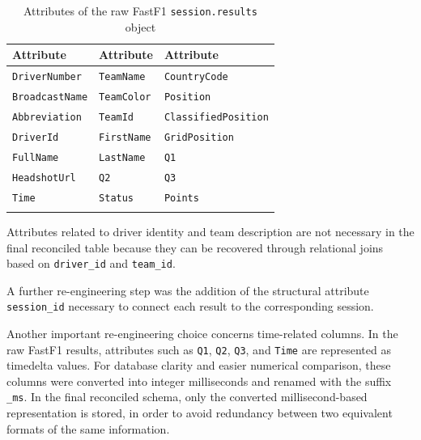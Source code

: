 \documentclass[12pt,a4paper]{article}
\begin{document}
	\begin{table}[H]
		\centering
		\caption{Attributes of the raw FastF1 \texttt{session.results} object}
		\renewcommand{\arraystretch}{1.15}
		\begin{tabularx}{\textwidth}{>{\raggedright\arraybackslash}X >{\raggedright\arraybackslash}X >{\raggedright\arraybackslash}X}
			\toprule
			\textbf{Attribute} & \textbf{Attribute} & \textbf{Attribute} \\
			\midrule
			\texttt{DriverNumber} & \texttt{TeamName} & \texttt{CountryCode} \\
			\texttt{BroadcastName} & \texttt{TeamColor} & \texttt{Position} \\
			\texttt{Abbreviation} & \texttt{TeamId} & \texttt{ClassifiedPosition} \\
			\texttt{DriverId} & \texttt{FirstName} & \texttt{GridPosition} \\
			\texttt{FullName} & \texttt{LastName} & \texttt{Q1} \\
			\texttt{HeadshotUrl} & \texttt{Q2} & \texttt{Q3} \\
			\texttt{Time} & \texttt{Status} & \texttt{Points} \\
			\multicolumn{3}{l}{\texttt{Laps}} \\
			\bottomrule
		\end{tabularx}
	\end{table}
	

	Attributes related to driver identity and team description  are not necessary in the final reconciled table because they can be recovered through relational joins based on \texttt{driver\_id} and \texttt{team\_id}.
	
	A further re-engineering step was the addition of the structural attribute \texttt{session\_id}
	necessary to connect each result to the corresponding session.

	
	Another important re-engineering choice concerns time-related columns.
	In the raw FastF1 results, attributes such as \texttt{Q1}, \texttt{Q2}, \texttt{Q3}, and \texttt{Time} are represented as timedelta values.
	For database clarity and easier numerical comparison, these columns were converted into integer milliseconds and renamed with the suffix \texttt{\_ms}.
	In the final reconciled schema, only the converted millisecond-based representation is stored, in order to avoid redundancy between two equivalent formats of the same information.
	
\end{document}
